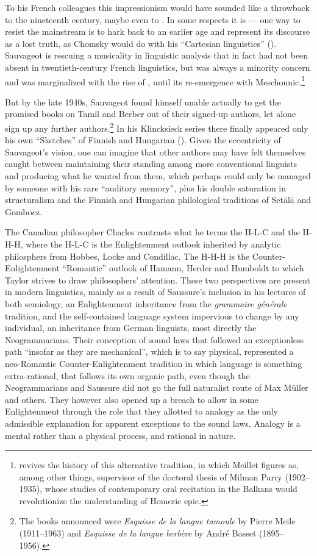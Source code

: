 \documentclass[output=paper]{langscibook}
\begin{document}
To his French colleagues this impressionism would have sounded like a throwback to the nineteenth century, maybe even to \citet{Rousseau1782175561}. In some respects it is — one way to resist the mainstream is to hark back to an earlier age and represent its discourse as a lost truth, as Chomsky would do with his ``Cartesian linguistics'' (\citeyear{Chomsky20091966}). Sauvageot is rescuing a musicality in linguistic analysis that in fact had not been absent in twentieth-century French linguistics, but was always a minority concern and was marginalized with the rise of , until its re-emergence with Meschonnic.\footnote{\citet{Saussy2016} revives the history of this alternative tradition, in which Meillet figures as, among other things, supervisor of the doctoral thesis of Milman Parry (1902--1935), whose studies of contemporary oral recitation in the Balkans would revolutionize the understanding of Homeric epic.}

But by the late 1940s, Sauvageot found himself unable actually to get the prom\-ised books on Tamil and Berber out of their signed-up authors, let alone sign up any further authors.\footnote{The books announced were \emph{Esquisse de la langue tamoule} by Pierre Meile (1911--1963) and \emph{Esquisse de la langue berbère} by André Basset (1895--1956).} In his Klincksieck series there finally appeared only his own ``Sketches'' of Finnish and Hungarian (\citeyear{Sauvageot1951}). Given the eccentricity of Sauvageot's vision, one can imagine that other authors may have felt themselves caught between maintaining their standing among more conventional linguists and producing what he wanted from them, which perhaps could only be managed by someone with his rare ``auditory memory'', plus his double saturation in structuralism and the Finnish and Hungarian philological traditions of Setälä and Gombocz.

The Canadian philosopher Charles \citet{Taylor2016} contrasts what he terms the H-L-C and the H-H-H, where the H-L-C is the Enlightenment outlook inherited by analytic philosphers from Hobbes, Locke and Condillac. The H-H-H is the Counter-Enlightenment ``Romantic'' outlook of Hamann, Herder and Humboldt to which Taylor strives to draw philosophers' attention. These two perspectives are present in modern linguistics, mainly as a result of Saussure's inclusion in his lectures of both semiology, an Enlightenment inheritance from the \emph{grammaire générale} tradition, and the self-contained language system impervious to change by any individual, an inheritance from German linguists, most directly the Neogrammarians. Their conception of sound laws that followed an exceptionless path ``insofar as they are mechanical'', which is to say physical, represented a neo-Romantic Counter-Enlightenment tradition in which language is something extra-rational, that follows its own organic path, even though the Neogrammarians and Saussure did not go the full naturalist route of Max Müller and others. They however also opened up a breach to allow in some Enlightenment through the role that they allotted to analogy as the only admissible explanation for apparent exceptions to the sound laws. Analogy is a mental rather than a physical process, and rational in nature.
\end{document}

